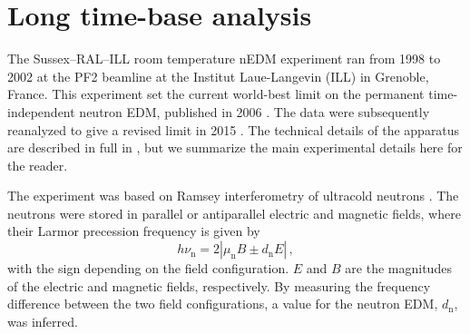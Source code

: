 \section{Long time-base analysis}
The Sussex--RAL--ILL room temperature nEDM experiment ran from 1998 to 2002 at the PF2 beamline at the Institut Laue-Langevin (ILL) in Grenoble, France.
This experiment set the current world-best limit on the permanent time-independent neutron EDM, published in 2006 \cite{Baker2006, *Baker2006B}. The data were subsequently reanalyzed to give a revised limit in 2015 \cite{Pendlebury2015}. The technical details of the apparatus are described in full in \cite{Baker2014}, but we summarize the main experimental details here for the reader.

The experiment was based on Ramsey interferometry \cite{Ramsey1950} of ultracold neutrons \cite{UCN-Review1979,UCN-Review1994}.
The neutrons were stored in parallel or antiparallel electric and magnetic fields, where their Larmor precession frequency is given by
\begin{equation}
  \label{eq:Larmor}
  h\nu_\mathrm{n} = 2 \left| \mu_\mathrm{n} B \pm d_\mathrm{n} E \right| \, ,
\end{equation}
with the sign depending on the field configuration.
$E$ and $B$ are the magnitudes of the electric and magnetic fields, respectively.
By measuring the frequency difference between the two field configurations, a value for the neutron EDM, $d_\mathrm{n}$, was inferred.

